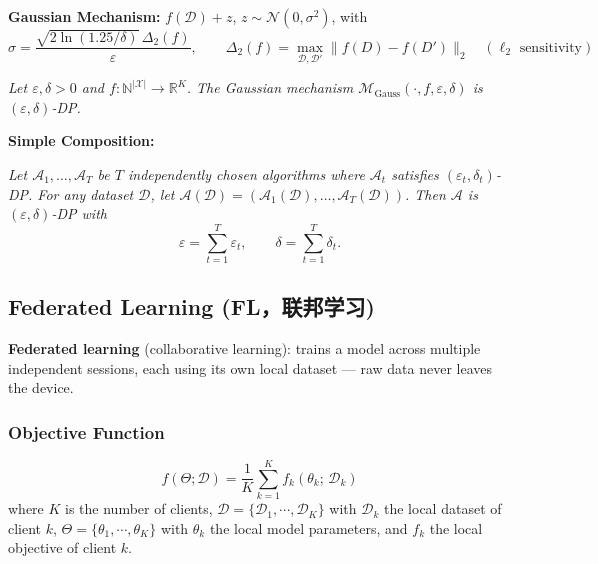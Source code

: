 \documentclass[UTF8]{ctexart}
\begin{document}
\textbf{Gaussian Mechanism:} $f(\mathcal{D}) + z$, $z \sim \mathcal{N}(0, \sigma^2)$, with
\[
    \sigma = \frac{\sqrt{2\ln(1.25/\delta)}\,\Delta_2(f)}{\varepsilon}, \qquad
    \Delta_2(f) = \max_{\mathcal{D},\mathcal{D}'} \|f(D) - f(D')\|_2 \quad (\ell_2 \text{ sensitivity})
\]

\begin{mdframed}[linewidth=1.5pt, linecolor=black!50, backgroundcolor=black!5,
    frametitle={\textbf{Theorem 3 (DP guarantees for Gaussian Mechanism)}},
    frametitlebackgroundcolor=black!25, frametitlerule=true]
\textit{Let $\varepsilon, \delta > 0$ and $f: \mathbb{N}^{|\mathcal{X}|} \to \mathbb{R}^K$. The Gaussian mechanism $\mathcal{M}_{\mathrm{Gauss}}(\cdot, f, \varepsilon, \delta)$ is $(\varepsilon, \delta)$-DP.}
\end{mdframed}

\textbf{Simple Composition:}

\begin{mdframed}[linewidth=1.5pt, linecolor=black!50, backgroundcolor=black!5,
    frametitle={\textbf{Theorem 4 (Multi-dim Composition)}},
    frametitlebackgroundcolor=black!25, frametitlerule=true]
\textit{Let $\mathcal{A}_1, \ldots, \mathcal{A}_T$ be $T$ independently chosen algorithms where $\mathcal{A}_t$ satisfies $(\varepsilon_t, \delta_t)$-DP. For any dataset $\mathcal{D}$, let $\mathcal{A}(\mathcal{D}) = (\mathcal{A}_1(\mathcal{D}), \ldots, \mathcal{A}_T(\mathcal{D}))$. Then $\mathcal{A}$ is $(\varepsilon, \delta)$-DP with}
\[
    \varepsilon = \sum_{t=1}^{T} \varepsilon_t, \qquad \delta = \sum_{t=1}^{T} \delta_t.
\]
\end{mdframed}

\subsection{Federated Learning (FL，联邦学习)}

\textbf{Federated learning} (collaborative learning): trains a model across multiple independent sessions, each using its own local dataset — raw data never leaves the device.

\subsubsection{Objective Function}
\[
    f(\Theta; \mathcal{D}) = \frac{1}{K} \sum_{k=1}^{K} f_k(\theta_k;\, \mathcal{D}_k)
\]
where $K$ is the number of clients, $\mathcal{D} = \{\mathcal{D}_1, \cdots, \mathcal{D}_K\}$ with $\mathcal{D}_k$ the local dataset of client $k$,
$\Theta = \{\theta_1, \cdots, \theta_K\}$ with $\theta_k$ the local model parameters, and $f_k$ the local objective of client $k$.
\end{document}
